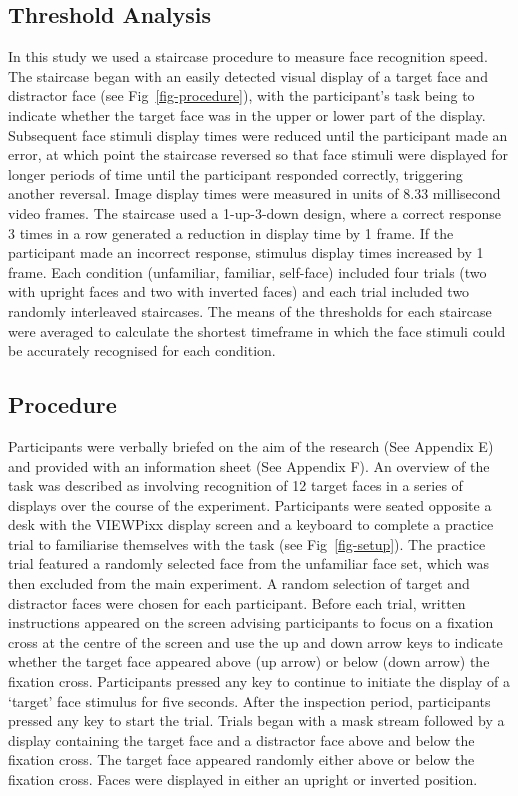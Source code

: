 \documentclass[
  10pt,
  letterpaper,
]{article}
\begin{document}
\subsection{Threshold Analysis}\label{threshold-analysis}

In this study we used a staircase procedure to measure face recognition
speed. The staircase began with an easily detected visual display of a
target face and distractor face (see Fig~\ref{fig-procedure}), with the
participant's task being to indicate whether the target face was in the
upper or lower part of the display. Subsequent face stimuli display
times were reduced until the participant made an error, at which point
the staircase reversed so that face stimuli were displayed for longer
periods of time until the participant responded correctly, triggering
another reversal. Image display times were measured in units of 8.33
millisecond video frames. The staircase used a 1-up-3-down design, where
a correct response 3 times in a row generated a reduction in display
time by 1 frame. If the participant made an incorrect response, stimulus
display times increased by 1 frame. Each condition (unfamiliar,
familiar, self-face) included four trials (two with upright faces and
two with inverted faces) and each trial included two randomly
interleaved staircases. The means of the thresholds for each staircase
were averaged to calculate the shortest timeframe in which the face
stimuli could be accurately recognised for each condition.

\subsection{Procedure}\label{procedure}

Participants were verbally briefed on the aim of the research (See
Appendix E) and provided with an information sheet (See Appendix F). An
overview of the task was described as involving recognition of 12 target
faces in a series of displays over the course of the experiment.
Participants were seated opposite a desk with the VIEWPixx display
screen and a keyboard to complete a practice trial to familiarise
themselves with the task (see Fig~\ref{fig-setup}). The practice trial
featured a randomly selected face from the unfamiliar face set, which
was then excluded from the main experiment. A random selection of target
and distractor faces were chosen for each participant. Before each
trial, written instructions appeared on the screen advising participants
to focus on a fixation cross at the centre of the screen and use the up
and down arrow keys to indicate whether the target face appeared above
(up arrow) or below (down arrow) the fixation cross. Participants
pressed any key to continue to initiate the display of a `target' face
stimulus for five seconds. After the inspection period, participants
pressed any key to start the trial. Trials began with a mask stream
followed by a display containing the target face and a distractor face
above and below the fixation cross. The target face appeared randomly
either above or below the fixation cross. Faces were displayed in either
an upright or inverted position.
\end{document}
